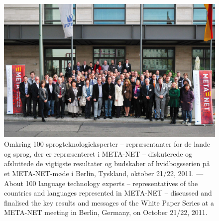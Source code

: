 \begin{figure}[htbp]
  \center
    \includegraphics[width=\textwidth]{../_media/meta-net_team_ebook.jpg}
  \caption{Omkring 100 sprogteknologieksperter -- repr\ae sentanter for de lande og sprog, der er repr\ae senteret i META-NET -- diskuterede og afsluttede de vigtigste resultater og budskaber af hvidbogsserien \mbox{p\aa} et META-NET-m\o de i Berlin, Tyskland, oktober 21/22, 2011. --- \textcolor{grey1}{About 100 language technology experts -- representatives of the countries and languages represented in META-NET -- discussed and finalised the key results and messages of the White Paper Series at a META-NET meeting in Berlin, Germany, on October 21/22, 2011.}}
\medskip
\end{figure}

\cleardoublepage
\pagestyle{empty} 
\mbox{ }

{}
\label{whitepaperseries}


